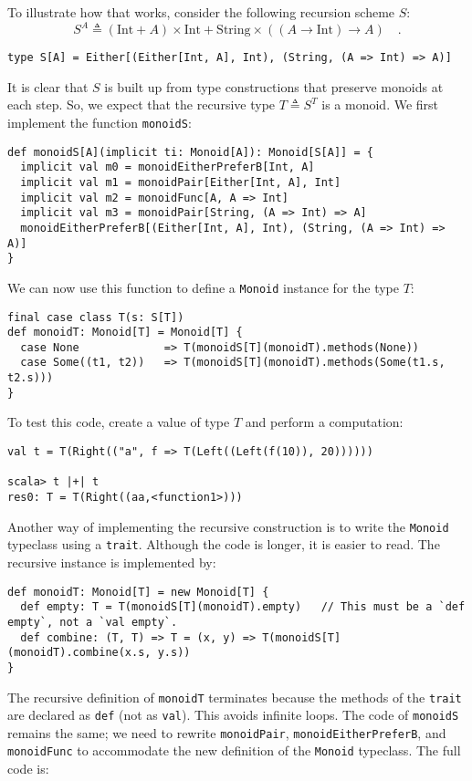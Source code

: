 To illustrate how that works, consider the following recursion scheme
$S$:
\[
S^{A}\triangleq\left(\text{Int}+A\right)\times\text{Int}+\text{String}\times\left(\left(A\rightarrow\text{Int}\right)\rightarrow A\right)\quad.
\]
\begin{lstlisting}
type S[A] = Either[(Either[Int, A], Int), (String, (A => Int) => A)]
\end{lstlisting}

It is clear that $S$ is built up from type constructions that preserve
monoids at each step. So, we expect that the recursive type $T\triangleq S^{T}$
is a monoid. We first implement the function \lstinline!monoidS!:
\begin{lstlisting}
def monoidS[A](implicit ti: Monoid[A]): Monoid[S[A]] = {
  implicit val m0 = monoidEitherPreferB[Int, A]
  implicit val m1 = monoidPair[Either[Int, A], Int]
  implicit val m2 = monoidFunc[A, A => Int]
  implicit val m3 = monoidPair[String, (A => Int) => A]
  monoidEitherPreferB[(Either[Int, A], Int), (String, (A => Int) => A)]
}
\end{lstlisting}
We can now use this function to define a \lstinline!Monoid! instance
for the type $T$:
\begin{lstlisting}
final case class T(s: S[T])
def monoidT: Monoid[T] = Monoid[T] {
  case None             => T(monoidS[T](monoidT).methods(None))
  case Some((t1, t2))   => T(monoidS[T](monoidT).methods(Some(t1.s, t2.s)))
}
\end{lstlisting}
To test this code, create a value of type $T$ and perform a computation:
\begin{lstlisting}
val t = T(Right(("a", f => T(Left((Left(f(10)), 20))))))

scala> t |+| t
res0: T = T(Right((aa,<function1>)))
\end{lstlisting}

Another way of implementing the recursive construction is to write
the \lstinline!Monoid! typeclass using a \lstinline!trait!. Although
the code is longer, it is easier to read. The recursive instance is
implemented by:
\begin{lstlisting}
def monoidT: Monoid[T] = new Monoid[T] {
  def empty: T = T(monoidS[T](monoidT).empty)   // This must be a `def empty`, not a `val empty`.
  def combine: (T, T) => T = (x, y) => T(monoidS[T](monoidT).combine(x.s, y.s))
}
\end{lstlisting}
 The recursive definition of \lstinline!monoidT! terminates because
the methods of the \lstinline!trait! are declared as \lstinline!def!
(not as \lstinline!val!). This avoids infinite loops. The code of
\lstinline!monoidS! remains the same; we need to rewrite \lstinline!monoidPair!,
\lstinline!monoidEitherPreferB!, and \lstinline!monoidFunc! to accommodate
the new definition of the \lstinline!Monoid! typeclass. The full
code is:

